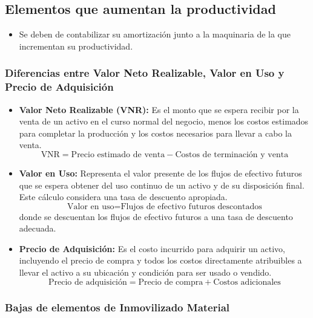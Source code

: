 \documentclass[a4paper,12pt]{article}
\begin{document}
\subsection*{Elementos que aumentan la productividad}
\begin{itemize}
    \item Se deben de contabilizar su amortización junto a la maquinaria de la que incrementan su productividad.
\end{itemize}
\begin{tcolorbox}[colback=yellow!20!white, colframe=yellow!80!black, title=Recordatorio]
\subsubsection*{Diferencias entre Valor Neto Realizable, Valor en Uso y Precio de Adquisición}

\begin{itemize}
    \item \textbf{Valor Neto Realizable (VNR):} Es el monto que se espera recibir por la venta de un activo en el curso normal del negocio, menos los costos estimados para completar la producción y los costos necesarios para llevar a cabo la venta.
    \[ \text{VNR} = \text{Precio estimado de venta} - \text{Costos de terminación y venta} \]

    \item \textbf{Valor en Uso:} Representa el valor presente de los flujos de efectivo futuros que se espera obtener del uso continuo de un activo y de su disposición final. Este cálculo considera una tasa de descuento apropiada.
    \[ \text{Valor en uso} = \text{Flujos de efectivo futuros descontados} \]
        donde se descuentan los flujos de efectivo futuros a una tasa de descuento adecuada.

    \item \textbf{Precio de Adquisición:} Es el costo incurrido para adquirir un activo, incluyendo el precio de compra y todos los costos directamente atribuibles a llevar el activo a su ubicación y condición para ser usado o vendido.
    \[ \text{Precio de adquisición} = \text{Precio de compra} + \text{Costos adicionales} \]

\end{itemize}

\end{tcolorbox}

\subsubsection{Bajas de elementos de Inmovilizado Material}
\end{document}
